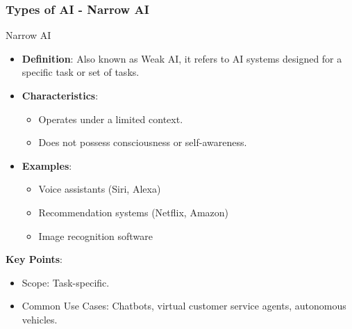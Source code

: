 \documentclass[aspectratio=169]{beamer}
\begin{document}
\begin{frame}[fragile]
    \frametitle{Types of AI - Narrow AI}
    \begin{block}{Narrow AI}
        \begin{itemize}
            \item \textbf{Definition}: Also known as Weak AI, it refers to AI systems designed for a specific task or set of tasks.
            \item \textbf{Characteristics}:
                \begin{itemize}
                    \item Operates under a limited context.
                    \item Does not possess consciousness or self-awareness.
                \end{itemize}
            \item \textbf{Examples}: 
                \begin{itemize}
                    \item Voice assistants (Siri, Alexa)
                    \item Recommendation systems (Netflix, Amazon)
                    \item Image recognition software
                \end{itemize}
        \end{itemize}
    \end{block}
    \textbf{Key Points}:
    \begin{itemize}
        \item Scope: Task-specific.
        \item Common Use Cases: Chatbots, virtual customer service agents, autonomous vehicles.
    \end{itemize}
\end{frame}
\end{document}
